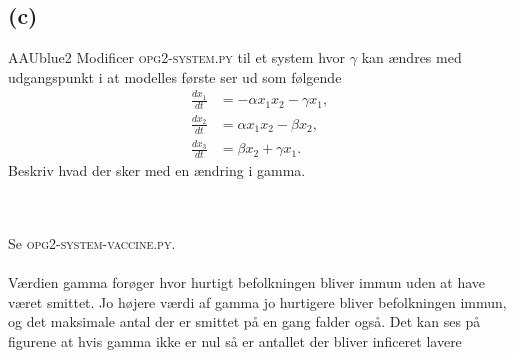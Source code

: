 \subsection*{(c)}
%
\begin{color}{AAUblue2}
%
Modificer \textsc{opg2-system.py} til et system hvor $\gamma$ kan ændres med udgangspunkt i at modelles første ser ud som følgende 
\begin{align}
\frac{dx_1}{dt} &= - \alpha x_1 x_2 - \gamma x_1, \\
\frac{dx_2}{dt} & = \alpha x_1 x_2 - \beta x_2 , \\
\frac{dx_3}{dt} & = \beta x_2 + \gamma x_1.
\end{align}
%
Beskriv hvad der sker med en ændring i gamma.  
%
\end{color}
\\\\
% 
Se \textsc{opg2-system-vaccine.py}.
\\\\
%
Værdien gamma forøger hvor hurtigt befolkningen bliver immun uden at have været smittet. Jo højere værdi af gamma jo hurtigere bliver befolkningen immun, og det maksimale antal der er smittet på en gang falder også. Det kan ses på figurene at hvis gamma ikke er nul så er antallet der bliver inficeret lavere
%
